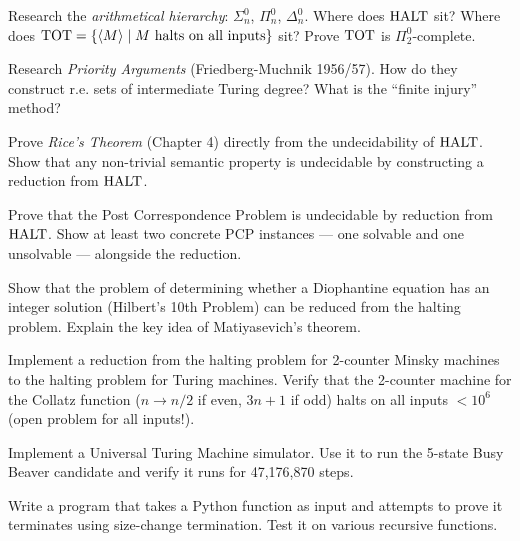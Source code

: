 \begin{exercise}[Challenge]
Research the \emph{arithmetical hierarchy}: $\Sigma^0_n$, $\Pi^0_n$, $\Delta^0_n$. Where does $\text{HALT}$ sit? Where does $\text{TOT} = \{ \langle M \rangle \mid M \text{ halts on all inputs} \}$ sit? Prove $\text{TOT}$ is $\Pi^0_2$-complete.
\end{exercise}

\begin{exercise}[Challenge]
Research \emph{Priority Arguments} (Friedberg-Muchnik 1956/57). How do they construct r.e. sets of intermediate Turing degree? What is the ``finite injury'' method?
\end{exercise}

\begin{exercise}[Challenge]
Prove \emph{Rice's Theorem} (Chapter 4) directly from the undecidability of $\text{HALT}$. Show that any non-trivial semantic property is undecidable by constructing a reduction from $\text{HALT}$.
\end{exercise}

\begin{exercise}[Challenge]
Prove that the Post Correspondence Problem is undecidable by reduction from $\text{HALT}$. Show at least two concrete PCP instances — one solvable and one unsolvable — alongside the reduction.
\end{exercise}

\begin{exercise}[Challenge]
Show that the problem of determining whether a Diophantine equation has an integer solution (Hilbert's 10th Problem) can be reduced from the halting problem. Explain the key idea of Matiyasevich's theorem.
\end{exercise}

\begin{exercise}[Computational]
Implement a reduction from the halting problem for 2-counter Minsky machines to the halting problem for Turing machines. Verify that the 2-counter machine for the Collatz function ($n \to n/2$ if even, $3n+1$ if odd) halts on all inputs $< 10^6$ (open problem for all inputs!).
\end{exercise}

\begin{exercise}[Computational]
Implement a Universal Turing Machine simulator. Use it to run the 5-state Busy Beaver candidate and verify it runs for 47,176,870 steps.
\end{exercise}

\begin{exercise}[Computational]
Write a program that takes a Python function as input and attempts to prove it terminates using size-change termination. Test it on various recursive functions.
\end{exercise}

